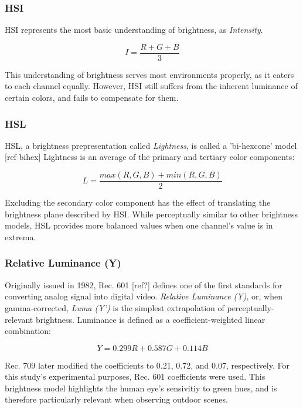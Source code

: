 \documentclass[12pt]{report}
\begin{document}
\subsubsection{HSI}

HSI represents the most basic understanding of brightness, as \textit{Intensity}. 

\begin{equation}
I = \dfrac{R + G + B}{3}
\end{equation}

This understanding of brightness serves most environments properly, as it caters to each channel equally. However, HSI still suffers from the inherent luminance of certain colors, and fails to compensate for them.

\subsubsection{HSL}

HSL, a brightness prepresentation called \textit{Lightness}, is called a 'bi-hexcone' model [ref bihex] Lightness is an average of the primary and tertiary color components:

\begin{equation}
L = \dfrac{max(R,G,B) + min(R,G,B)}{2}
\end{equation}

Excluding the secondary color component has the effect of translating the brightness plane described by HSI. While perceptually similar to other brightness models, HSL provides more balanced values when one channel's value is in extrema.

\subsubsection{Relative Luminance (Y)}

Originally issued in 1982, Rec. 601 [ref?] defines 	one of the first standards for converting analog signal into digital video. \textit{Relative Luminance (Y)}, or, when gamma-corrected, \textit{Luma (Y')} is the simplest extrapolation of perceptually-relevant brightness. Luminance is defined as a coefficient-weighted linear combination:

\begin{equation}
Y = 0.299R + 0.587G + 0.114B
\end{equation}

Rec. 709 later modified the coefficients to 0.21, 0.72, and 0.07, respectively. For this study's experimental purposes, Rec. 601 coefficients were used. This brightness model highlights the human eye's sensivitiy to green hues, and is therefore particularly relevant when observing outdoor scenes. 
\end{document}
